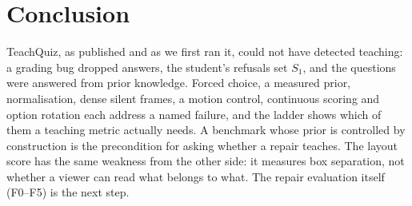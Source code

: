 \section{Conclusion}

TeachQuiz, as published and as we first ran it, could not have detected teaching: a grading bug dropped answers,
the student's refusals set $S_1$, and the questions were answered from prior knowledge. Forced choice, a measured
prior, normalisation, dense silent frames, a motion control, continuous scoring and option rotation each address a
named failure, and the ladder shows which of them a teaching metric actually needs. A benchmark whose prior is
controlled by construction is the precondition for asking whether a repair teaches. The layout score has the same
weakness from the other side: it measures box separation, not whether a viewer can read what belongs to what. The
repair evaluation itself (F0--F5) is the next step.
